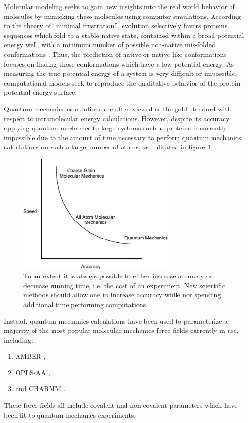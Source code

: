 Molecular modeling seeks to gain new insights into the real world behavior of molecules by mimicking these molecules using computer simulations.
According to the theory of ``minimal frustration'', evolution selectively favors proteins sequences which fold to a stable native state, contained within a broad potential energy well, with a minimum number of possible non-native mis-folded conformations \cite{bryngelson1987spin}.
Thus, the prediction of native or native-like conformations focuses on finding those conformations which have a low potential energy.
As measuring the true potential energy of a system is very difficult or impossible, computational models seek to reproduce the qualitative behavior of the protein potential energy surface.

Quantum mechanics calculations are often viewed as the gold standard with respect to intramolecular energy calculations.
However, despite its accuracy, applying quantum mechanics to large systems such as proteins is currently impossible due to the amount of time necessary to perform quantum mechanics calculations on such a large number of atoms, as indicated in figure \ref{figure:conservation_of_annoyance}.
\begin{figure}[h]
\begin{center}
\includegraphics[width=0.7\textwidth]{figures/conservation_of_annoyance.png}
\caption{To an extent it is always possible to either increase accuracy or decrease running time, i.e. the cost of an experiment.
New scientific methods should allow one to increase accuracy while not spending additional time performing computations.}
\label{figure:conservation_of_annoyance}
\end{center}
\end{figure}
Instead, quantum mechanics calculations have been used to parameterize a majority of the most popular molecular mechanics force fields currently in use, including:
\begin{enumerate}
\item AMBER \cite{weiner1984new},
\item OPLS-AA \cite{kaminski1994free},
\item and CHARMM \cite{mackerell2002charmm}.
\end{enumerate}
These force fields all include covalent and non-covalent parameters which have been fit to quantum mechanics experiments.


